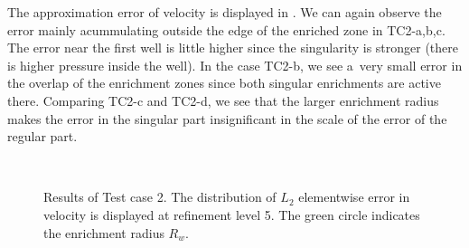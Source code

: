 The approximation error of velocity is displayed in . We can again observe
the error mainly acummulating outside the edge of the enriched zone in TC2-a,b,c.
The error near the first well is little higher since the singularity is stronger (there is higher pressure inside the well).
In the case TC2-b, we see a~very small error in the overlap of the enrichment zones
since both singular enrichments are active there.
Comparing TC2-c and TC2-d, we see that the larger enrichment radius makes the error in the singular part insignificant
in the scale of the error of the regular part.

%
\begin{figure}[!htb]
    \centering
     \\
    \caption
    {Results of Test case 2. The distribution of $L_2$ elementwise error in velocity is displayed at refinement level 5.
    The green circle indicates the enrichment radius $R_w$. }
    \label{fig:mh_tc2_error}
\end{figure}
%

